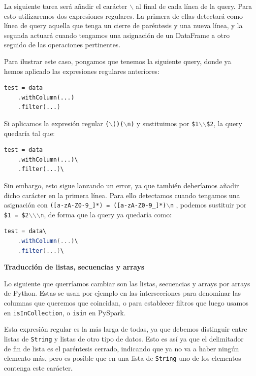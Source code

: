 \documentclass[12pt,twoside,titlepage]{report}
\begin{document}
La siguiente tarea será añadir el carácter \texttt{$\backslash$} al final de cada línea de la query. Para esto utilizaremos dos expresiones regulares. La primera de ellas detectará como línea de query aquella que tenga un cierre de paréntesis y una nueva línea, y la segunda actuará cuando tengamos una asignación de un DataFrame a otro seguido de las operaciones pertinentes.

Para ilustrar este caso, pongamos que tenemos la siguiente query, donde ya hemos aplicado las expresiones regulares anteriores:

\begin{lstlisting}
test = data
	.withColumn(...)
	.filter(...)
\end{lstlisting}

Si aplicamos la expresión regular \texttt{($\backslash$))($\backslash$n)} y sustituimos por  \texttt{\$1$\backslash$$\backslash$\$2}, la query quedaría tal que:

\begin{lstlisting}
test = data
	.withColumn(...)\
	.filter(...)\
\end{lstlisting}

Sin embargo, esto sigue lanzando un error, ya que también deberíamos añadir dicho carácter en la primera línea. Para ello detectamos cuando tengamos una asignación con \texttt{([a-zA-Z0-9\-\_]*) = ([a-zA-Z0-9\-\_]*)$\backslash$n}
, podemos sustituir por \texttt{\$1 = \$2$\backslash$$\backslash$$\backslash$n}, de forma que la query ya quedaría como:

\begin{lstlisting}[language=scala]
test = data\
	.withColumn(...)\
	.filter(...)\
\end{lstlisting}


\textbf{Traducción de listas, secuencias y arrays}

Lo siguiente que querríamos cambiar son las listas, secuencias y arrays por arrays de Python. Estas se usan por ejemplo en las intersecciones para denominar las columnas que queremos que coincidan, o para establecer filtros que luego usamos en \texttt{isInCollection}, o \texttt{isin} en PySpark. 

Esta expresión regular es la más larga de todas, ya que debemos distinguir entre listas de \texttt{String} y listas de otro tipo de datos. Esto es así ya que el delimitador de fin de lista es el paréntesis cerrado, indicando que ya no va a haber ningún elemento más, pero es posible que en una lista de \texttt{String} uno de los elementos contenga este carácter.
\end{document}
